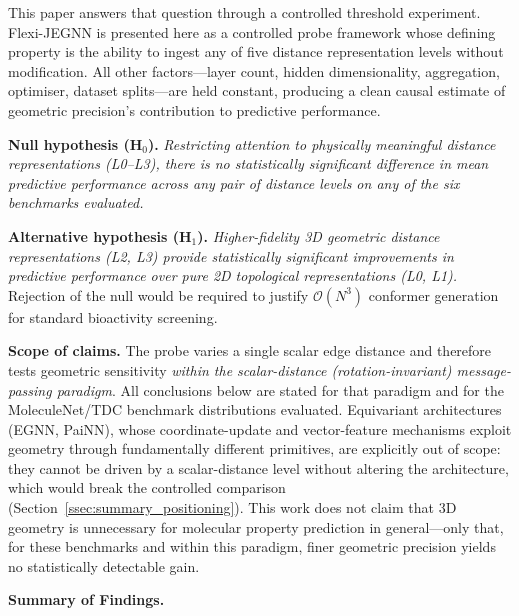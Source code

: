 \documentclass[pdflatex,sn-vancouver-num]{sn-jnl}%
\theoremstyle{thmstyleone}%
\theoremstyle{thmstyletwo}%
\theoremstyle{thmstylethree}%
\begin{document}
This paper answers that question through a controlled threshold experiment.
Flexi-JEGNN is presented here as a controlled probe framework whose
defining property is the ability to ingest any of five distance
representation levels without modification.  All other
factors---layer count, hidden dimensionality, aggregation, optimiser,
dataset splits---are held constant, producing a clean causal estimate of
geometric precision's contribution to predictive performance.

\noindent\textbf{Null hypothesis (H$_0$).}
\emph{Restricting attention to physically meaningful distance
representations (L0--L3), there is no statistically significant difference
in mean predictive performance across any pair of distance levels on any of
the six benchmarks evaluated.}

\noindent\textbf{Alternative hypothesis (H$_1$).}
\emph{Higher-fidelity 3D geometric distance representations (L2, L3) provide statistically significant improvements in predictive performance over pure 2D topological representations (L0, L1).}
Rejection of the null would be required
to justify $\mathcal{O}(N^3)$ conformer generation for standard bioactivity
screening.

\noindent\textbf{Scope of claims.}  The probe varies a single scalar edge
distance and therefore tests geometric sensitivity \emph{within the
scalar-distance (rotation-invariant) message-passing paradigm}.  All
conclusions below are stated for that paradigm and for the MoleculeNet/TDC
benchmark distributions evaluated.  Equivariant architectures (EGNN,
PaiNN), whose coordinate-update and vector-feature mechanisms exploit
geometry through fundamentally different primitives, are explicitly out of
scope: they cannot be driven by a scalar-distance level without altering
the architecture, which would break the controlled comparison
(Section~\ref{ssec:summary_positioning}).  This work does not claim that 3D geometry
is unnecessary for molecular property prediction in general---only that, for
these benchmarks and within this paradigm, finer geometric precision yields
no statistically detectable gain.



\textbf{Summary of Findings.}
\end{document}
